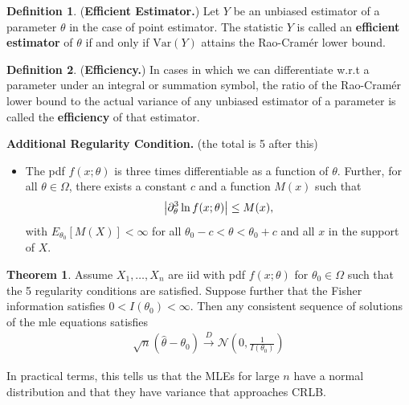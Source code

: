 \documentclass{book}
\theoremstyle{definition}
\newtheorem{defn}{Definition}[section]
\newtheorem{thm}{Theorem}[section]
\newcommand{\p}{\partial}
\newcommand{\N}{\mathcal{N}}
\newcommand{\f}[2]{\frac{#1}{#2}}
\newcommand{\lp}{\left(}
\newcommand{\rp}{\right)}
\begin{document}
\begin{defn}
	(\textbf{Efficient Estimator.}) Let $Y$ be an unbiased estimator of a parameter $\theta$ in the case of point estimator. The statistic $Y$ is called an \textbf{efficient estimator} of $\theta$ if and only if $\text{Var}(Y)$ attains the Rao-Cram\'er lower bound.  
\end{defn}


\begin{defn}
	(\textbf{Efficiency.}) In cases in which we can differentiate w.r.t a parameter under an integral or summation symbol, the ratio of the Rao-Cram\'er lower bound to the actual variance of any unbiased estimator of a parameter is called the \textbf{efficiency} of that estimator. 
\end{defn}











\noindent \textbf{Additional Regularity Condition.} (the total is 5 after this)
\begin{itemize}
	\item The pdf $f(x;\theta)$ is three times differentiable as a function of $\theta$. Further, for all $\theta \in \Omega$, there exists a constant $c$ and a function $M(x)$ such that
	\begin{align}
	\abs{\p^3_\theta \ln f(x;\theta) } \leq M(x),
	\end{align}
	with $E_{\theta_0}[M(X)] < \infty$ for all $\theta_0 - c < \theta < \theta_0 + c$ and all $x$ in the support of $X$. 
\end{itemize}  




\begin{thm}
	Assume $X_1,\dots, X_n$ are iid with pdf $f(x;\theta)$ for $\theta_0 \in \Omega$ such that the 5 regularity conditions are satisfied. Suppose further that the Fisher information satisfies $0 < I(\theta_0 ) < \infty$. Then any consistent sequence of solutions of the mle equations satisfies
	\begin{align}
	\sqrt{n}(\hat\theta - \theta_0) \xrightarrow{D} \N\lp 0,\f{1}{I(\theta_0)} \rp
	\end{align}
\end{thm}

In practical terms, this tells us that the MLEs for large $n$ have a normal distribution and that they have variance that approaches CRLB. 
\end{document}
